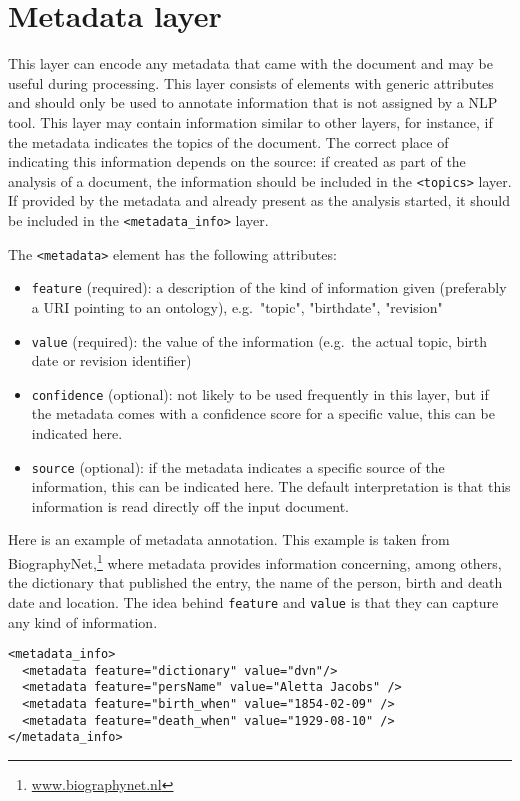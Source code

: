 
\section{Metadata layer}
\label{sec:metadata-layer}

This layer can encode any metadata that came with the document and may be useful during processing. This layer consists of elements with generic attributes and should only be used to annotate information that is not assigned by a NLP tool. This layer may contain information similar to other layers, for instance, if the metadata indicates the topics of the document. The correct place of indicating this information depends on the source: if created as part of the analysis of a document, the information should be included in the \texttt{<topics>} layer. If provided by the metadata and already present as the analysis started, it should be included in the \texttt{<metadata_info>} layer. 

The \texttt{<metadata>} element has the following attributes:
\begin{itemize}
\item \texttt{feature} (required): a description of the kind of information given (preferably a URI pointing to an ontology), e.g.\ "topic", "birthdate", "revision"
\item \texttt{value} (required): the value of the information (e.g.\ the actual topic, birth date or revision identifier)
\item \texttt{confidence} (optional): not likely to be used frequently in this layer, but if the metadata comes with a confidence score for a specific value, this can be indicated here.
\item \texttt{source} (optional): if the metadata indicates a specific source of the information, this can be indicated here. The default interpretation is that this information is read directly off the input document.
\end{itemize}

Here is an example of metadata annotation. This example is taken from BiographyNet,\footnote{\url{www.biographynet.nl}} where metadata provides information concerning, among others, the dictionary that published the entry, the name of the person, birth and death date and location. The idea behind \texttt{feature} and \texttt{value} is that they can capture any kind of information.

\begin{Verbatim}
<metadata_info>
  <metadata feature="dictionary" value="dvn"/>
  <metadata feature="persName" value="Aletta Jacobs" />
  <metadata feature="birth_when" value="1854-02-09" />
  <metadata feature="death_when" value="1929-08-10" />
</metadata_info>
\end{Verbatim}


